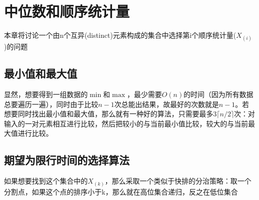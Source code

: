 \documentclass[]{report}
\begin{document}
	\chapter{中位数和顺序统计量}
		本章将讨论一个由n个互异(distinct)元素构成的集合中选择第i个顺序统计量($X_{(i)}$)的问题
	\section{最小值和最大值}
		显然，想要得到一组数据的$\min$和$\max$，最少需要$O(n)$的时间（因为所有数据总要遍历一遍），同时由于比较$n-1$次总能出结果，故最好的次数就是$n-1$。若想要同时找出最小值和最大值，那么就有一种好的算法，只需要最多$3\lceil n/2\rceil$次：对输入的一对元素相互进行比较，然后把较小的与当前最小值比较，较大的与当前最大值进行比较。
	\section{期望为限行时间的选择算法}
		如果想要找到这个集合中的$X_{(k)}$，那么采取一个类似于快排的分治策略：取一个分割点，如果这个点的排序小于k，那么就在高位集合递归，反之在低位集合
\end{document}
